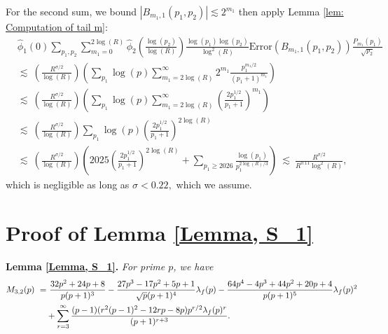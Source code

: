 \documentclass[11pt, reqno]{amsart}
\theoremstyle{definition}
\theoremstyle{remark}
\numberwithin{equation}{section}
\renewcommand{\hat}{\widehat}
\begin{document}
For the second sum, we bound $|B_{m_1,1}(p_1,p_2)|\lesssim 2^{m_1}$ then apply Lemma \ref{lem: Computation of tail m}: \begin{align*}
&\hat{\phi}_1(0)\sum_{p_1,p_2}\sum_{m_1=0}^{2\log(R)}\hat{\phi}_2\left(\frac{\log(p_2)}{\log(R)} \right)\frac{\log(p_1) \log(p_2)}{\log^2(R)}\text{Error}(B_{m_1,1}(p_1,p_2))\frac{P_{m_1}(p_1)}{\sqrt{p_2}}  \\
&\lesssim\ \left(\frac{R^{\sigma/2}}{\log(R)}\right)\left(\sum_{p_1}\log(p)\sum_{m_1=2\log(R)}^\infty 2^{m_1}\frac{p_1^{m_1/2}}{(p_1+1)^{m_1}}\right) \\
&\lesssim\ \left(\frac{R^{\sigma/2}}{\log(R)}\right)\left(\sum_{p_1}\log(p)\sum_{m_1=2\log(R)}^\infty \left(\frac{2p_1^{1/2}}{p_1+1}\right)^{m_1}\right) \\
&\lesssim\ \left(\frac{R^{\sigma/2}}{\log(R)}\right)\sum_{p_1}\log(p)\left(\frac{2p_1^{1/2}}{p_1+1}\right)^{2\log(R)} \\
&\lesssim\ \left(\frac{R^{\sigma/2}}{\log(R)}\right)\left(2025\left(\frac{2p_1^{1/2}}{p_1+1}\right)^{2\log(R)} + \sum_{p_1\geq 2026} \frac{\log(p_1)}{p_1^{2\log(R)/3}}\right) \ \lesssim \ \frac{R^{\sigma/2}}{R^{0.11}\log^2(R)},
\end{align*}
which is negligible as long as $\sigma < 0.22,$ which we assume.
\appendix
\section{Proof of Lemma \ref{Lemma, S_1} } \label{appendix: Proof of Lemma M3,2}
\noindent \textbf{Lemma \ref{Lemma, S_1}.}
    \textit{For prime $p$, we have }
    \begin{align}
        M_{3,2}(p)\ =&\ \frac{32p^2+24p+8}{p(p+1)^3} - \frac{27p^3-17p^2+5p+1}{\sqrt{p}(p+1)^4}\lambda_f(p)-\frac{64p^4-4p^3+44p^2+20p+4}{p(p+1)^5} \lambda_f(p)^2
        \notag\\&+ \sum_{r=3}^{\infty}\frac{(p-1)(r^2(p-1)^2-12rp-8p)p^{r/2}\lambda_f(p)^r}{(p+1)^{r+3}}.
    \end{align} 
\end{document}
